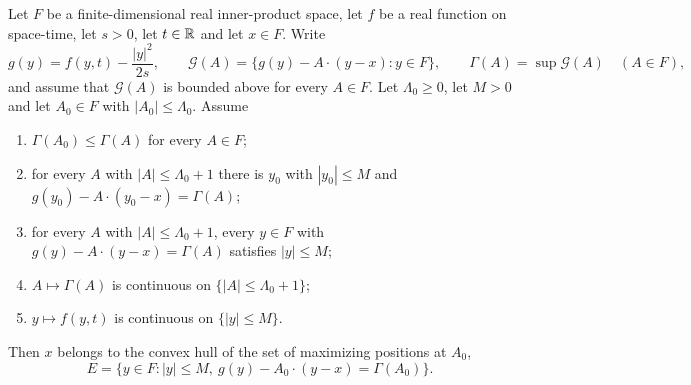 \begin{lemma}
Let $F$ be a finite-dimensional real inner-product space, let $f$ be a real
function on space-time, let $s>0$, let $t\in\mathbb{R}$ and let $x\in F$. Write
\[
  g(y)=f(y,t)-\frac{|y|^2}{2s},
  \qquad
  \mathcal G(A)=\bigl\{g(y)-A\cdot(y-x):y\in F\bigr\},
  \qquad
  \Gamma(A)=\sup\mathcal G(A)\quad(A\in F),
\]
and assume that $\mathcal G(A)$ is bounded above for every $A\in F$.
Let $\Lambda_0\ge0$, let $M>0$ and let $A_0\in F$ with $|A_0|\le\Lambda_0$.
Assume
\begin{enumerate}
\item[(a)] $\Gamma(A_0)\le\Gamma(A)$ for every $A\in F$;
\item[(b)] for every $A$ with $|A|\le\Lambda_0+1$ there is $y_0$ with
$|y_0|\le M$ and $g(y_0)-A\cdot(y_0-x)=\Gamma(A)$;
\item[(c)] for every $A$ with $|A|\le\Lambda_0+1$, every $y\in F$ with
$g(y)-A\cdot(y-x)=\Gamma(A)$ satisfies $|y|\le M$;
\item[(d)] $A\mapsto\Gamma(A)$ is continuous on $\{|A|\le\Lambda_0+1\}$;
\item[(e)] $y\mapsto f(y,t)$ is continuous on $\{|y|\le M\}$.
\end{enumerate}
Then $x$ belongs to the convex hull of the set of maximizing positions at $A_0$,
\[
  E=\bigl\{y\in F:|y|\le M,\ g(y)-A_0\cdot(y-x)=\Gamma(A_0)\bigr\}.
\]
\end{lemma}
